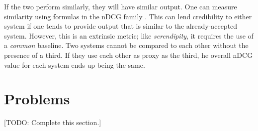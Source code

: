 If the two perform similarly, they will have similar output. One can measure similarity using formulas in the nDCG family \citep{Wang:2006:TOT:1150402.1150450}. This can lend credibility to either system if one tends to provide output that is similar to the already-accepted system. However, this is an extrinsic metric; like \emph{serendipity}, it requires the use of a \textit{common} baseline. Two systems cannot be compared to each other without the presence of a third. If they use each other as proxy as the third, he overall nDCG value for each system ends up being the same.


\section{Problems}

[TODO: Complete this section.]
